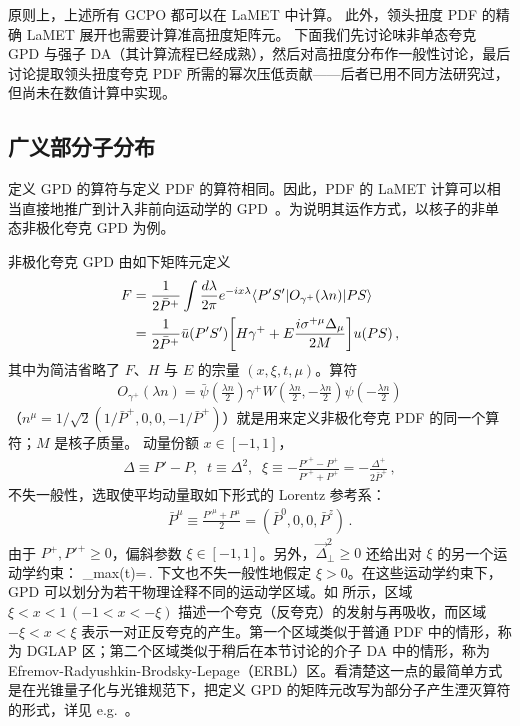 原则上，上述所有 GCPO 都可以在 LaMET 中计算。
%
此外，领头扭度 PDF 的精确 LaMET 展开也需要计算准高扭度矩阵元。
下面我们先讨论味非单态夸克 GPD 与强子 DA（其计算流程已经成熟），然后对高扭度分布作一般性讨论，最后讨论提取领头扭度夸克 PDF 所需的幂次压低贡献——后者已用不同方法研究过，但尚未在数值计算中实现。


\subsection{广义部分子分布}
\label{sec:others-gpd}

定义 GPD 的算符与定义 PDF 的算符相同。因此，PDF 的 LaMET 计算可以相当直接地推广到计入非前向运动学的 GPD~\cite{Liu:2018tox}。为说明其运作方式，以核子的非单态非极化夸克 GPD 为例。


非极化夸克 GPD 由如下矩阵元定义~\cite{Ji:2004gf}
\begin{align}\label{eq:GPD}
	F&=\frac{1}{2{\bar P}^+}\int \frac{d\lambda}{2\pi}e^{-i x\lambda}\langle P'S'|O_{\gamma^+}(\lambda n)|PS\rangle\nonumber\\
	&=\frac{1}{2{\bar P}^+}\bar{u}(P'S')\bigg[H\gamma^+
	+E\frac{i\sigma^{+\mu}\Delta_\mu}{2M}\bigg]u(PS)\,,
\end{align}
其中为简洁省略了 $F$、$H$ 与 $E$ 的宗量 $(x,\xi,t, \mu)$。算符
\begin{align}
	O_{\gamma^+}(\lambda n)=\bar\psi(\frac{\lambda n} 2)\gamma^+ W(\frac{\lambda n}{2},-\frac{\lambda n}{2})\psi(-\frac{\lambda n} 2)
\end{align}
（$n^\mu=1/\sqrt 2(1/{\bar P}^+, 0,0, -1/{\bar P}^+)$）就是用来定义非极化夸克 PDF 的同一个算符；$M$ 是核子质量。
%
动量份额 $x\in [-1,1]$，
\begin{align}\label{eq:kinematic_variable}
	\Delta\equiv P'-P,\;\; t\equiv \Delta^2,\;\; \xi\equiv -\frac{P'^+-P^+}{P'^++P^+}=-\frac{\Delta^+}{2{\bar P}^+}\,,
\end{align}
不失一般性，选取使平均动量取如下形式的 Lorentz 参考系：
\begin{align}
	{\bar P}^\mu\equiv\frac{P'^\mu+P^\mu}{2}=({\bar P}^0,0,0,{\bar P}^z)\,.
\end{align}
由于 $P^+, P'^+\ge0$，偏斜参数 $\xi\in[-1,1]$。另外，$\vec \Delta^2_\perp\ge 0$ 还给出对 $\xi$ 的另一个运动学约束：
\beq\label{eq:sklimit}
\xi\le\xi_{\rm max}(t)=\,.
\eeq
下文也不失一般性地假定 $\xi>0$。在这些运动学约束下，GPD 可以划分为若干物理诠释不同的运动学区域。如  所示，区域 $\xi<x<1\, (-1<x<-\xi)$ 描述一个夸克（反夸克）的发射与再吸收，而区域 $-\xi<x<\xi$ 表示一对正反夸克的产生。第一个区域类似于普通 PDF 中的情形，称为 DGLAP 区；第二个区域类似于稍后在本节讨论的介子 DA 中的情形，称为 Efremov-Radyushkin-Brodsky-Lepage（ERBL）区。看清楚这一点的最简单方式是在光锥量子化与光锥规范下，把定义 GPD 的矩阵元改写为部分子产生湮灭算符的形式，详见 e.g.~\cite{Ji:2004gf}。

